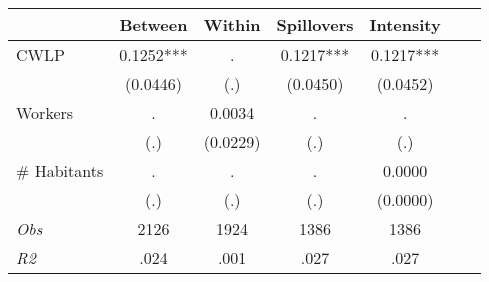 \begin{tabular}{l*{6}{c}}\hline&\multicolumn{1}{c}{Between}&\multicolumn{1}{c}{Within}&\multicolumn{1}{c}{Spillovers}&\multicolumn{1}{c}{Intensity}\\ \hline 
CWLP & 0.1252*** & . & 0.1217*** & 0.1217*** \\
 & (0.0446) & (.) & (0.0450) & (0.0452) \\
Workers & . & 0.0034 & . & . \\
 & (.) & (0.0229) & (.) & (.) \\
\# Habitants & . & . & . & 0.0000 \\
  & (.) & (.) & (.) & (0.0000) \\
\hline \textit{Obs} & 2126 & 1924 & 1386 & 1386  \\ \textit{R2} & .024 & .001 & .027 & .027 \\ \hline \end{tabular}
